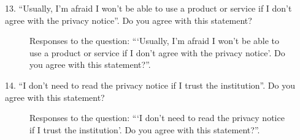 \vspace{2cm}

13. ``Usually, I'm afraid I won't be able to use a product or service if I don't agree with the privacy notice''. Do you agree with this statement?

\begin{figure}[H]
    \begin{center}
        \caption*{Responses to the question: ```Usually, I'm afraid I won't be able to use a product or service if I don't agree with the privacy notice'. Do you agree with this statement?''.}
        \label{fig:survey_s2_q13}
    \end{center}
\end{figure}

14. ``I don't need to read the privacy notice if I trust the institution''. Do you agree with this statement?

\begin{figure}[H]
    \begin{center}
        \caption*{Responses to the question: ```I don't need to read the privacy notice if I trust the institution'. Do you agree with this statement?''.}
        \label{fig:survey_s2_q14}
    \end{center}
\end{figure}

